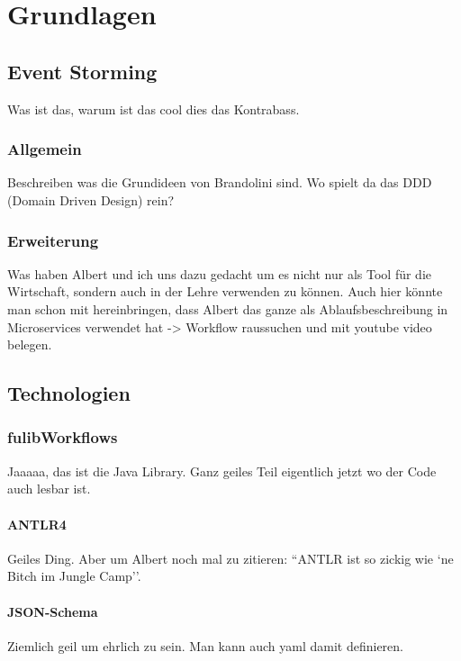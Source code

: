 \chapter{Grundlagen}\label{ch:technologien}


\section{Event Storming}\label{sec:event-storming}
Was ist das, warum ist das cool dies das Kontrabass.

\subsection{Allgemein}\label{subsec:allgemein}
Beschreiben was die Grundideen von Brandolini sind.
Wo spielt da das DDD (Domain Driven Design) rein?

\subsection{Erweiterung}\label{subsec:erweiterung}
Was haben Albert und ich uns dazu gedacht um es nicht nur als Tool für die Wirtschaft, sondern
auch in der Lehre verwenden zu können.
Auch hier könnte man schon mit hereinbringen, dass Albert das ganze als Ablaufsbeschreibung in
Microservices verwendet hat -> Workflow raussuchen und mit youtube video belegen.

\section{Technologien}\label{sec:technologien}

\subsection{fulibWorkflows}\label{subsec:fulibworkflows}
Jaaaaa, das ist die Java Library.
Ganz geiles Teil eigentlich jetzt wo der Code auch lesbar ist.

\subsubsection{ANTLR4}\label{subsubsec:antlr4}
Geiles Ding.
Aber um Albert noch mal zu zitieren: ``ANTLR ist so zickig wie `ne Bitch im Jungle Camp''.

\subsubsection{JSON-Schema}\label{subsubsec:json-schema}
Ziemlich geil um ehrlich zu sein.
Man kann auch yaml damit definieren.

